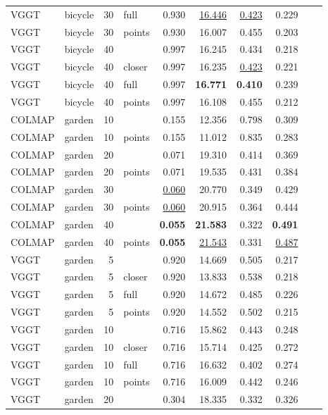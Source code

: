 \begin{table}[H]
\begin{tabular}{llrlrrrrlr}
VGGT & bicycle & 30 & full & 0.930 & \underline{16.446} & \underline{0.423} & 0.229 &  &  \\
VGGT & bicycle & 30 & points & 0.930 & 16.007 & 0.455 & 0.203 &  &  \\
VGGT & bicycle & 40 &  & 0.997 & 16.245 & 0.434 & 0.218 &  &  \\
VGGT & bicycle & 40 & closer & 0.997 & 16.235 & \underline{0.423} & 0.221 &  &  \\
VGGT & bicycle & 40 & full & 0.997 & \textbf{16.771} & \textbf{0.410} & 0.239 &  &  \\
VGGT & bicycle & 40 & points & 0.997 & 16.108 & 0.455 & 0.212 &  &  \\
\midrule
COLMAP & garden & 10 &  & 0.155 & 12.356 & 0.798 & 0.309 &  &  \\
COLMAP & garden & 10 & points & 0.155 & 11.012 & 0.835 & 0.283 &  &  \\
COLMAP & garden & 20 &  & 0.071 & 19.310 & 0.414 & 0.369 &  &  \\
COLMAP & garden & 20 & points & 0.071 & 19.535 & 0.431 & 0.384 &  &  \\
COLMAP & garden & 30 &  & \underline{0.060} & 20.770 & 0.349 & 0.429 &  &  \\
COLMAP & garden & 30 & points & \underline{0.060} & 20.915 & 0.364 & 0.444 &  &  \\
COLMAP & garden & 40 &  & \textbf{0.055} & \textbf{21.583} & 0.322 & \textbf{0.491} &  &  \\
COLMAP & garden & 40 & points & \textbf{0.055} & \underline{21.543} & 0.331 & \underline{0.487} &  &  \\
VGGT & garden & 5 &  & 0.920 & 14.669 & 0.505 & 0.217 &  &  \\
VGGT & garden & 5 & closer & 0.920 & 13.833 & 0.538 & 0.218 &  &  \\
VGGT & garden & 5 & full & 0.920 & 14.672 & 0.485 & 0.226 &  &  \\
VGGT & garden & 5 & points & 0.920 & 14.552 & 0.502 & 0.215 &  &  \\
VGGT & garden & 10 &  & 0.716 & 15.862 & 0.443 & 0.248 &  &  \\
VGGT & garden & 10 & closer & 0.716 & 15.714 & 0.425 & 0.272 &  &  \\
VGGT & garden & 10 & full & 0.716 & 16.632 & 0.402 & 0.274 &  &  \\
VGGT & garden & 10 & points & 0.716 & 16.009 & 0.442 & 0.246 &  &  \\
VGGT & garden & 20 &  & 0.304 & 18.335 & 0.332 & 0.326 &  &  \\

\end{tabular}
\end{table}
